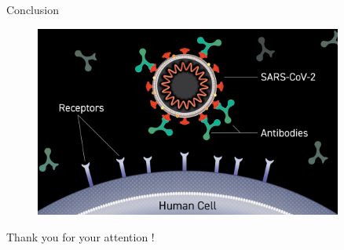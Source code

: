 \begin{frame}{Conclusion}
    \begin{figure}
        \centering
        \includegraphics[width=0.9\textwidth]{../Images/covid19_mab.png}
        \label{fig:covid}
    \end{figure}

\end{frame}


\begin{frame}[standout]
    Thank you for your attention !
\end{frame}